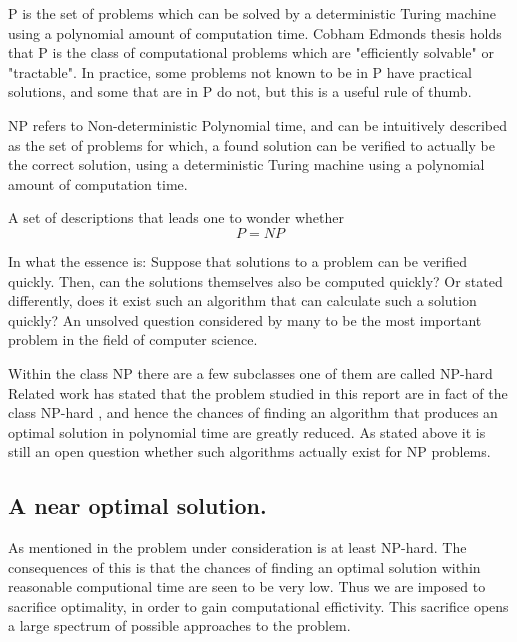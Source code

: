 P is the set of problems which can be solved by a deterministic Turing machine using a polynomial amount of computation time.
Cobham Edmonds thesis holds that P is the class of computational problems which are "efficiently solvable" or "tractable". In practice, some problems not known to be in P have practical solutions, and some that are in P do not, but this is a useful rule of thumb.

NP refers to Non-deterministic Polynomial time, and can be intuitively described as the set of problems for which, a found solution can be verified to actually be the correct solution, using a deterministic Turing machine using a polynomial amount of computation time.

A set of descriptions that leads one to wonder whether
\begin{equation}
P = NP
\end{equation}

In what the essence is:
Suppose that solutions to a problem can be verified quickly. Then, can the solutions themselves also be computed quickly?
Or stated differently, does it exist such an algorithm that can calculate such a solution quickly?
An unsolved question considered by many to be the most important problem in the field of computer science. 

Within the class NP there are a few subclasses one of them are called NP-hard 
Related work has stated that the problem studied in this report are in fact of the class NP-hard \cite{paper1}, %
and hence the chances of finding an algorithm that produces an optimal solution in polynomial time are greatly reduced. As stated above it is still an open question whether such algorithms actually exist for NP problems. 

\subsection{A near optimal solution.}
As mentioned in \cite{paper1} the problem under consideration is at least NP-hard. The consequences of this is that the chances of finding an optimal solution within reasonable computional time are seen to be very low. Thus we are imposed to sacrifice optimality, in order to gain computational effictivity. This sacrifice opens a large spectrum of possible approaches to the problem.


